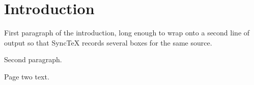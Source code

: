 \documentclass{article}
\begin{document}
\section{Introduction}
First paragraph of the introduction, long enough to wrap onto a second line
of output so that SyncTeX records several boxes for the same source.

Second paragraph.



\newpage
Page two text.
\end{document}
